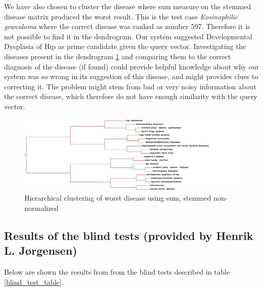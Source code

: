 We have also chosen to cluster the disease where sum measure on the
stemmed disease matrix produced the worst result. This is the test
case \textit{Eosinophilic granuloma} where the correct disease was
ranked as number 597. Therefore it is not possible to find it in the
dendrogram. Our system suggested Developmental Dysplasia of Hip as
prime candidate given the query vector. Investigating the diseases
present in the dendrogram
\ref{sum_stem_top20_worst_developmental_dysplasia_of_hip} and
comparing them to the correct diagnosis of the disease (if found)
could provide helpful knowledge about why our system was so wrong in
its suggestion of this disease, and might provides clues to correcting
it. The problem might stem from bad or very noisy information about
the correct disease, which therefore do not have enough similarity
with the query vector.

\begin{figure}[H]
  \begin{center}
    \includegraphics[width=1.3\textwidth]{clusters/sum_stem_top20_worst_developmental_dysplasia_of_hip.jpg}
  \end{center}
  \caption{Hierarchical clustering of worst disease using sum, stemmed non-normalized}
  \label{sum_stem_top20_worst_developmental_dysplasia_of_hip}
\end{figure}

\subsection{Results of the blind tests (provided by Henrik L. J\o rgensen)\label{Blindtest}}

Below are shown the results from from the blind tests described in table \ref{blind_test_table}.

